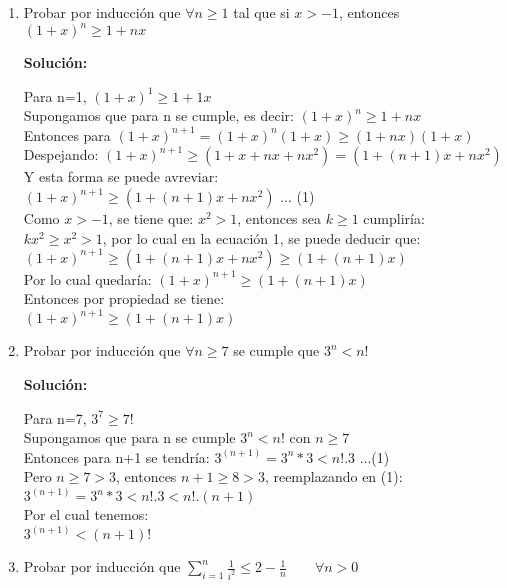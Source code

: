 \documentclass{article}
\begin{document}
\begin{enumerate}
  \item Probar por inducción que 
  $\forall n \geq 1$ tal que si $x>-1$, entonces $(1+x)^n \geq 1 + nx$
  
  \textbf{Solución:}
  
  Para n=1, \((1+x)^1 \geq 1 + 1x \) \\
  Supongamos que para n se cumple, es decir:  \((1+x)^n \geq 1 + nx\) \\
  Entonces para \((1+x)^{n+1} = (1+x)^n (1+x) \geq (1+nx)(1+x)\)\\
  Despejando:
  \((1+x)^{n+1} \geq (1+x+nx+nx^2) = (1+(n+1)x+nx^2)\)\\
  Y esta forma se puede avreviar:\\
  \((1+x)^{n+1} \geq (1+(n+1)x+nx^2) \) ... (1)\\
  Como \(x > -1\), se tiene que: \(x^2 > 1\), entonces sea  \(k \geq 1\) cumpliría:\\
  \(kx^2 \geq x^2 > 1\), por lo cual en la ecuación 1, se puede deducir que:\\
  \((1+x)^{n+1} \geq  (1+(n+1)x+nx^2) \geq (1+(n+1)x)  \)\\
  Por lo cual quedaría:
  \((1+x)^{n+1} \geq (1+(n+1)x)  \)\\
  
  Entonces por propiedad se tiene:\\
  \((1+x)^{n+1} \geq (1+(n+1)x)\)\\
  
  \item Probar por inducción que
  $\forall n \geq 7$ se cumple que $3^n<n!$
  
  \textbf{Solución:}
  
  Para n=7, \(3^7 \geq 7! \) \\
  Supongamos que para n se cumple $3^n<n!$ con $n \geq 7$\\
  Entonces para n+1 se tendría:
  $3^(n+1) = 3 ^n * 3 < n! . 3 $ ...(1) \\
  Pero $ n \geq 7 > 3$, entonces $n+1 \geq 8 > 3$, reemplazando en (1):\\
  $3^(n+1) = 3 ^n * 3 < n! . 3 < n! . (n+1)$ \\
  Por el cual tenemos:\\
  $3^(n+1) < (n+1)!$ \\
  
  
  \item Probar por inducción que
  \(\sum_{i=1}^n\frac{1}{i^2}\leq 2-\frac{1}{n}  \qquad\forall n>0\)
  

\end{enumerate}
\end{document}
